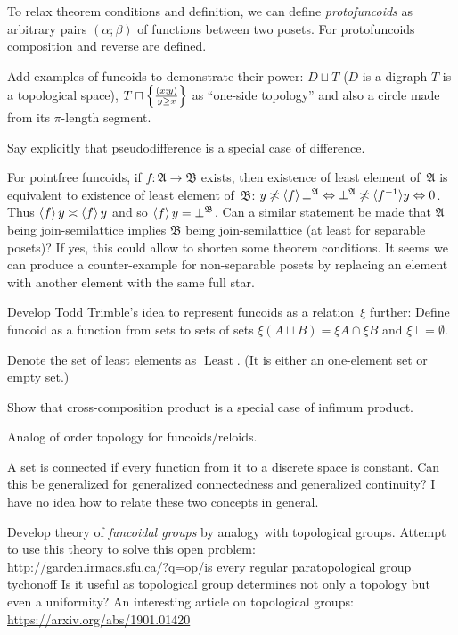 \documentclass{amsart}
\begin{document}
To relax theorem conditions and definition, we can define \emph{protofuncoids} as arbitrary pairs $(\alpha;\beta)$ of functions
between two posets. For protofuncoids composition and reverse are defined.

Add examples of funcoids to demonstrate their power:
$D\sqcup T$ ($D$ is a digraph $T$ is a topological space),
$T\sqcap\left\{ \frac{(x;y)}{y\ge x}\right\}$ as ``one-side topology'' and also a circle made from its $\pi$-length segment.

Say explicitly that pseudodifference is a special case of difference.

For pointfree funcoids, if $f:\mathfrak{A}\rightarrow\mathfrak{B}$ exists,
then existence of least element of~$\mathfrak{A}$ is equivalent to existence of least element of~$\mathfrak{B}$:
$y \not\asymp \left\langle f\right\rangle \bot^{\mathfrak{A}} \Leftrightarrow
\bot^{\mathfrak{A}} \not\asymp \langle f^{- 1} \rangle y \Leftrightarrow 0$. Thus
$\left\langle f\right\rangle y \asymp \left\langle f\right\rangle y$ and so $\left\langle f\right\rangle y =
\bot^{\mathfrak{B}}$.
Can a similar statement be made that $\mathfrak{A}$ being join-semilattice implies $\mathfrak{B}$ being join-semilattice
(at least for separable posets)? If yes, this could allow to shorten some theorem conditions.
It seems we can produce a counter-example for non-separable posets by replacing an element with another element with the same full star.

Develop Todd Trimble's idea to represent funcoids as a relation~$\xi$ further:
Define funcoid as a function from sets to sets of sets
$\xi(A\sqcup B) = \xi A\cap\xi B$ and $\xi\bot=\emptyset$.

Denote the set of least elements as $\operatorname{Least}$. (It is either an
one-element set or empty set.)

Show that cross-composition product is a special case of infimum product.

Analog of order topology for funcoids/reloids.

A set is connected if every function from it to a discrete space is constant. Can this be generalized for generalized connectedness and generalized continuity? I have no idea how to relate these two concepts in general.

Develop theory of \emph{funcoidal groups} by analogy with topological groups.
Attempt to use this theory to solve this open problem:\\
\url{http://garden.irmacs.sfu.ca/?q=op/is every regular paratopological group tychonoff}
Is it useful as topological group determines not only a topology but even a uniformity?
An interesting article on topological groups:
\url{https://arxiv.org/abs/1901.01420}
\end{document}
